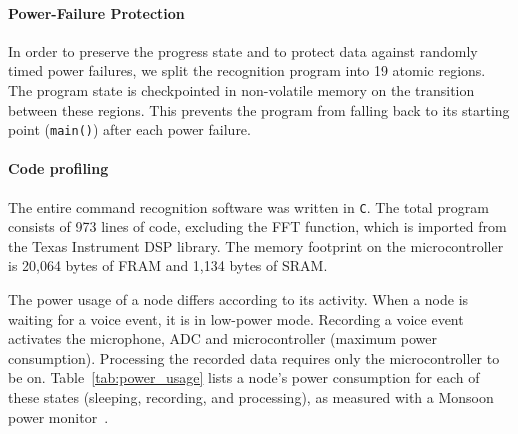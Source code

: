 

\paragraph{Power-Failure Protection}
In order to preserve the progress state and to protect \cim data against randomly timed power failures, we split the recognition program into 19 atomic regions. 
The program state is checkpointed in non-volatile memory on the transition between these regions. This prevents the program from falling back to its starting point (\texttt{main()}) after each power failure. 

\paragraph{Code profiling}
The entire command recognition software was written in {\tt C}. The total program consists of 973 lines of code, excluding the FFT function, which is imported from the Texas Instrument DSP library.
The memory footprint on the microcontroller is 20,064 bytes of FRAM and 1,134 bytes of SRAM.

The power usage of a node differs according to its activity. When a node is waiting for a voice event, it is in low-power mode. Recording a voice event activates the microphone, ADC and microcontroller (maximum power consumption). Processing the recorded data requires only the microcontroller to be on. Table~\ref{tab:power_usage} lists a node's power consumption for each of these states (sleeping, recording, and processing), as measured with a Monsoon power monitor~\cite{monsoon}. 


